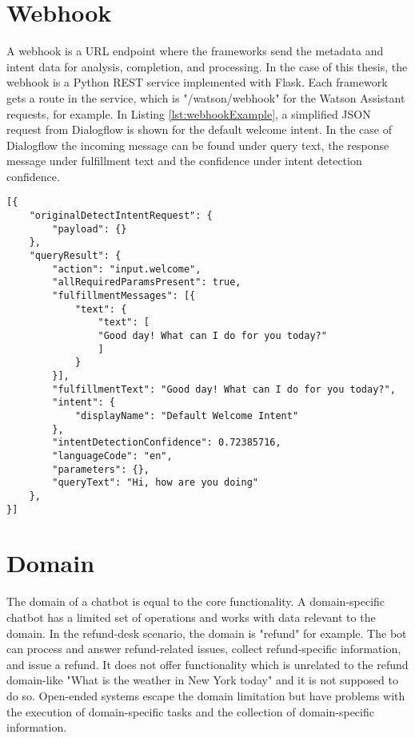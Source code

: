\section{Webhook} \label{sec:webhook}
A webhook is a URL endpoint where the frameworks send the metadata and intent data for analysis, completion, and processing.
In the case of this thesis, the webhook is a Python REST service implemented with Flask.
Each framework gets a route in the service, which is "/watson/webhook" for the Watson Assistant requests, for example.
In Listing \ref{lst:webhookExample}, a simplified JSON request from Dialogflow is shown for the default welcome intent.
In the case of Dialogflow the incoming message can be found under query text, the response message under fulfillment text and the confidence under intent detection confidence. 
\begin{lstlisting}[caption={Dialogflow Webhook Request Example}, label={lst:webhookExample},captionpos=b,frame=single,language={[Sharp]C},commentstyle=\color{mygreen},keywordstyle=\color{blue},
morekeywords={}]                
[{
    "originalDetectIntentRequest": {
        "payload": {}
    },
    "queryResult": {
        "action": "input.welcome",
        "allRequiredParamsPresent": true,
        "fulfillmentMessages": [{
            "text": {
                "text": [
                "Good day! What can I do for you today?"
                ]
            }
        }],
        "fulfillmentText": "Good day! What can I do for you today?",
        "intent": {
            "displayName": "Default Welcome Intent"
        },
        "intentDetectionConfidence": 0.72385716,
        "languageCode": "en",
        "parameters": {},
        "queryText": "Hi, how are you doing"
    },
}]\end{lstlisting}  


\section{Domain}
The domain of a chatbot is equal to the core functionality.
A domain-specific chatbot has a limited set of operations and works with data relevant to the domain.
In the refund-desk scenario, the domain is "refund" for example.
The bot can process and answer refund-related issues, collect refund-specific information, and issue a refund. 
It does not offer functionality which is unrelated to the refund domain-like 
"What is the weather in New York today" and it is not supposed to do so.
Open-ended systems escape the domain limitation but have problems with the execution of domain-specific tasks and the collection of domain-specific information. 

